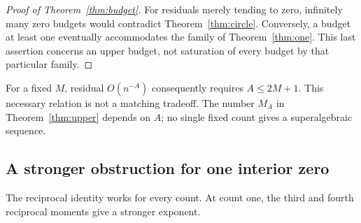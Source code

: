 \documentclass[11pt]{article}
\theoremstyle{remark}\newtheorem{remark}[theorem]{Remark}
\begin{document}
\begin{proof}[Proof of Theorem~\ref{thm:budget}]
For residuals merely tending to zero, infinitely many zero budgets
would contradict Theorem~\ref{thm:circle}. Conversely, a budget
at least one eventually accommodates the family of
Theorem~\ref{thm:one}. This last assertion concerns an upper budget,
not saturation of every budget by that particular family.
\end{proof}

For a fixed \(M\), residual \(O(n^{-A})\) consequently requires
\(A\le2M+1\). This necessary relation is not a matching tradeoff.
The number \(M_A\) in Theorem~\ref{thm:upper} depends on \(A\);
no single fixed count gives a superalgebraic sequence.

\subsection{A stronger obstruction for one interior zero}
The reciprocal identity works for every count. At count one, the
third and fourth reciprocal moments give a stronger exponent.
\end{document}
